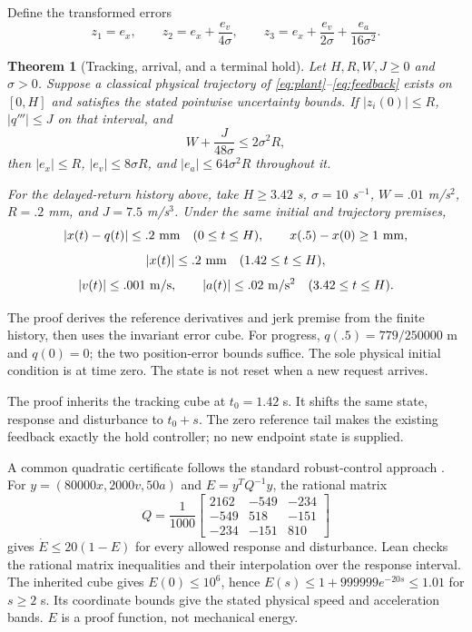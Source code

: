 \documentclass[10pt,letterpaper]{article}
\newtheorem{theorem}{Theorem}
\begin{document}
Define the transformed errors
\[
 z_1=e_x,\qquad z_2=e_x+\frac{e_v}{4\sigma},\qquad
 z_3=e_x+\frac{e_v}{2\sigma}+\frac{e_a}{16\sigma^2}.
\]
\begin{theorem}[Tracking, arrival, and a terminal hold]\label{thm:physical}
Let $H,R,W,J\geq0$ and $\sigma>0$.
Suppose a classical physical trajectory of
\eqref{eq:plant}--\eqref{eq:feedback} exists on $[0,H]$ and satisfies the stated
pointwise uncertainty bounds. If $|z_i(0)|\leq R$, $|q'''|\leq J$ on that interval,
and
\[
 W+\frac{J}{48\sigma}\leq2\sigma^2R,
\]
then $|e_x|\leq R$, $|e_v|\leq8\sigma R$, and $|e_a|\leq64\sigma^2R$ throughout it.

For the delayed-return history above, take $H\geq3.42$ s, $\sigma=10$ s$^{-1}$,
$W=.01$ m/s$^2$, $R=.2$ mm, and $J=7.5$ m/s$^3$. Under the same initial and
trajectory premises,
\[
 |x(t)-q(t)|\leq.2\ {\rm mm}\quad(0\leq t\leq H),
 \qquad x(.5)-x(0)\geq1\ {\rm mm},
\]
\[
 |x(t)|\leq.2\ {\rm mm}\quad(1.42\leq t\leq H),
\]
\[
 |v(t)|\leq.001\ {\rm m/s},\qquad |a(t)|\leq.02\ {\rm m/s^2}
 \quad(3.42\leq t\leq H).
\]
\end{theorem}
The proof derives the reference derivatives and jerk premise from the finite
history, then uses the invariant error cube. For progress,
$q(.5)=779/250000$ m and $q(0)=0$; the two position-error bounds suffice.
The sole physical initial condition is at time zero. The state is not reset
when a new request arrives.

The proof inherits the tracking cube at $t_0=1.42$ s. It shifts the same state,
response and disturbance to $t_0+s$. The zero reference tail makes the existing
feedback exactly the hold controller; no new endpoint state is supplied.

A common quadratic certificate follows the standard robust-control approach
\cite{lmibook}. For $y=(80000x,2000v,50a)$ and $E=y^TQ^{-1}y$, the rational matrix
\[
 Q=\frac1{1000}\begin{bmatrix}2162&-549&-234\\-549&518&-151\\-234&-151&810\end{bmatrix}
\]
gives $\dot E\leq20(1-E)$ for every allowed response and disturbance.
Lean checks the rational matrix inequalities and their interpolation over the
response interval. The inherited cube gives $E(0)\leq10^6$, hence
$E(s)\leq1+999999e^{-20s}\leq1.01$ for $s\geq2$ s. Its coordinate bounds give
the stated physical speed and acceleration bands. $E$ is a proof function,
not mechanical energy.
\end{document}
